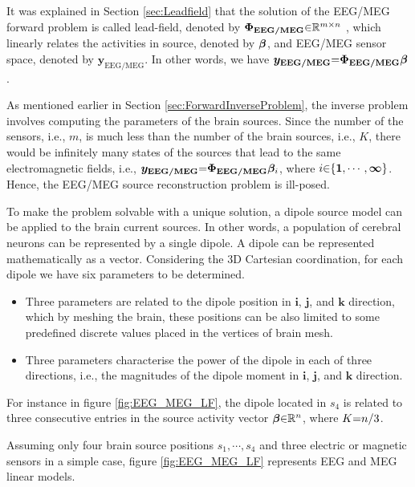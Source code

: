 It was explained in Section \ref{sec:Leadfield} that the solution of the  EEG/MEG forward problem is called lead-field, denoted by $\boldsymbol{\Phi}_{\boldsymbol{\mathrm{{EEG/MEG}}}} {\in} \mathbb{R}^{m {\times} n}$ , which linearly relates the activities in source, denoted by $\boldsymbol{\beta}$, and EEG/MEG sensor space, denoted by $\boldsymbol{y_\mathrm{{EEG/MEG}}}$.
In other words, we have $\boldsymbol{y_\mathrm{{EEG/MEG}}} {=} \boldsymbol{\Phi}_{\boldsymbol{\mathrm{{EEG/MEG}}}} \boldsymbol{\beta}$.
 
As mentioned earlier in Section \ref{sec:ForwardInverseProblem}, the inverse problem involves computing the parameters of the brain sources.
Since the number of the sensors, i.e., $m$, is much less than the number of the brain sources, i.e., $K$, there would be infinitely many states of the sources that lead to the same electromagnetic fields, i.e., $\boldsymbol{y_\mathrm{{EEG/MEG}}} {=} \boldsymbol{\Phi}_{\boldsymbol{\mathrm{{EEG/MEG}}}} \boldsymbol{\beta}_i$, where $i {\in} \{\boldsymbol{1}, \cdots , \boldsymbol{\infty} \}$.
Hence, the EEG/MEG source reconstruction problem is ill-posed. 

To make the problem solvable with a unique solution, a dipole source model can be applied to the brain current sources.
In other words, a population of cerebral neurons can be represented by a single dipole.
A dipole can be represented mathematically as a vector.
Considering the 3D Cartesian coordination, for each dipole we have six parameters to be determined.
\begin{itemize}
\item 
Three parameters are related to the dipole position in $\boldsymbol{i}$, $\boldsymbol{j}$, and $\boldsymbol{k}$ direction, which by meshing the brain, these positions can be also limited to some predefined discrete values placed in the vertices of brain mesh.
\item 
Three parameters characterise the power of the dipole in each of three directions, i.e., the magnitudes of the dipole moment in $\boldsymbol{i}$, $\boldsymbol{j}$, and $\boldsymbol{k}$ direction.
\end{itemize}

For instance in figure \ref{fig:EEG_MEG_LF}, the dipole located in $s_4$ is related to three consecutive entries in the source activity vector $\boldsymbol{\beta} {\in} \mathbb{R}^n$, where $K {=} n {/} 3$.



Assuming only four brain source positions $s_1 , \cdots , s_4$ and three electric or magnetic sensors in a simple case, figure \ref{fig:EEG_MEG_LF} represents EEG and MEG linear models.

